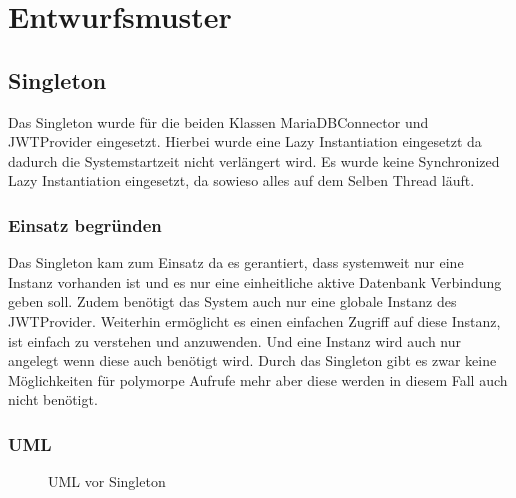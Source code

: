 \chapter{Entwurfsmuster}


\section{Singleton}

Das Singleton wurde für die beiden Klassen MariaDBConnector und JWTProvider eingesetzt.
Hierbei wurde eine Lazy Instantiation eingesetzt da dadurch die Systemstartzeit nicht verlängert wird.
Es wurde keine Synchronized Lazy Instantiation eingesetzt, da sowieso alles auf dem Selben Thread läuft.

\subsection{Einsatz begründen}

Das Singleton kam zum Einsatz da es gerantiert,
dass systemweit nur eine Instanz vorhanden ist und es nur eine einheitliche aktive Datenbank Verbindung geben soll.
Zudem benötigt das System auch nur eine globale Instanz des JWTProvider.
Weiterhin ermöglicht es einen einfachen Zugriff auf diese Instanz, ist einfach zu verstehen und anzuwenden.
Und eine Instanz wird auch nur angelegt wenn diese auch benötigt wird.
Durch das Singleton gibt es zwar keine Möglichkeiten für polymorpe Aufrufe mehr aber diese werden in diesem Fall auch nicht benötigt.


\subsection{UML}


\begin{figure}[htbp]
    \centering
    \caption{\label{1} UML vor Singleton}
\end{figure}

